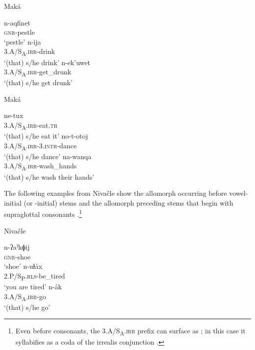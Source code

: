 \ea\label{ex:sylln:1:mak}
    Maká \citep[90--91, 147, fn. 41]{AG94}
    \begin{xlist}
        \ex\gll n-aqfinet\\
                {\textsc{gnr}}-pestle\\
                \glt `pestle'
        \ex\gll n-ija\\
                3.A/S\textsubscript{A}.{\textsc{irr}}-drink\\
                \glt `(that) s/he drink'
        \ex\gll n-ek'uwet\\
                3.A/S\textsubscript{A}.{\textsc{irr}}-get\_drunk\\
                \glt `(that) s/he get drunk'
    \end{xlist}
\z

\ea\label{ex:sylln:2:mak}
    Maká \citep[85--86, 96]{AG94}
    \begin{xlist}
        \ex\gll ne-tux\\
                3.A/S\textsubscript{A}.{\textsc{irr}}-eat.{\textsc{tr}}\\
                \glt `(that) s/he eat it'
        \ex\gll no-t-otoj\\
                3.A/S\textsubscript{A}.{\textsc{irr}}-3.{\textsc{intr}}-dance\\
                \glt `(that) s/he dance'
        \ex\gll na-wanqa\\
                3.A/S\textsubscript{A}.{\textsc{irr}}-wash\_hands\\
                \glt `(that) s/he wash their hands'
    \end{xlist}
\z

The following examples from Nivaĉle show the allomorph  occurring before vowel\mbox{-}initial (or \mbox{-}initial) stems  and the allomorph  preceding stems that begin with supraglottal consonants .\footnote{Even before consonants, the  3.A/S\textsubscript{A}.{\textsc{irr}} prefix can surface as ; in this case it syllabifies as a coda of the irrealis conjunction .}

\ea\label{ex:sylln:1:niv}
    Nivaĉle \citep[159, 256, 414]{LC20}
    \begin{xlist}
        \ex\gll n-ʔaˀkɸij~\\
                {\textsc{gnr}}-shoe\\
                \glt `shoe'
        \ex\gll n-uɬåx\\
                2.P/S\textsubscript{P}.{\textsc{rls}}-be\_tired\\
                \glt `you are tired'
        \ex\gll n-åk\\
                3.A/S\textsubscript{A}.{\textsc{irr}}-go\\
                \glt `(that) s/he go'
    \end{xlist}
\z

